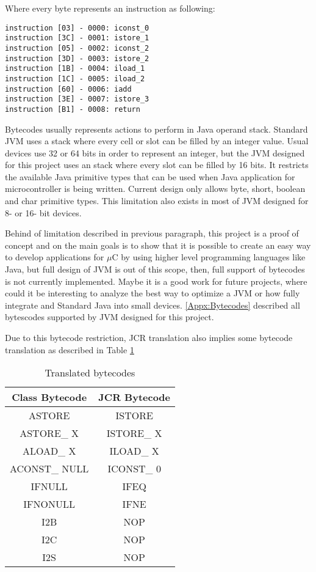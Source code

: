 Where every byte represents an instruction as following:

\medskip
\begin{lstlisting}
instruction [03] - 0000: iconst_0
instruction [3C] - 0001: istore_1
instruction [05] - 0002: iconst_2
instruction [3D] - 0003: istore_2
instruction [1B] - 0004: iload_1
instruction [1C] - 0005: iload_2
instruction [60] - 0006: iadd
instruction [3E] - 0007: istore_3
instruction [B1] - 0008: return
\end{lstlisting}
\medskip

Bytecodes usually represents actions to perform in Java operand stack. Standard JVM uses a stack where every cell or slot can be filled by an integer value. Usual devices use 32 or 64 bits in order to represent an integer, but the JVM designed for this project uses an stack where every slot can be filled by 16 bits. It restricts the available Java primitive types that can be used when Java application for microcontroller is being written. Current design only allows byte, short, boolean and char primitive types. This limitation also exists in most of JVM designed for 8- or 16- bit devices.

Behind of limitation described in previous paragraph, this project is a proof of concept and on the main goals is to show that it is possible to create an easy way to develop applications for $\mu$C by using higher level programming languages like Java, but full design of JVM is out of this scope, then, full support of bytecodes is not currently implemented. Maybe it is a good work for future projects, where could it be interesting to analyze the best way to optimize a JVM or how fully integrate and Standard Java into small devices. \ref{Appx:Bytecodes} described all bytescodes supported by JVM designed for this project.

Due to this bytecode restriction, JCR translation also implies some bytecode translation as described in Table \ref{tab:SS:JVM:JCR:TransBytecodes}

\begin{table}[!htb]
\centering
\begin{tabular}{|c|c|}
\hline 
Class Bytecode & JCR Bytecode \\ 
\hline 
ASTORE & ISTORE \\ 
\hline 
ASTORE\_ X & ISTORE\_ X \\ 
\hline 
ALOAD\_ X & ILOAD\_ X \\ 
\hline 
ACONST\_ NULL & ICONST\_ 0 \\ 
\hline 
IFNULL & IFEQ \\ 
\hline 
IFNONULL & IFNE \\ 
\hline 
I2B & NOP \\ 
\hline 
I2C & NOP \\ 
\hline 
I2S & NOP \\ 
\hline 
\end{tabular}
\caption{Translated bytecodes}
\label{tab:SS:JVM:JCR:TransBytecodes}
\end{table}


